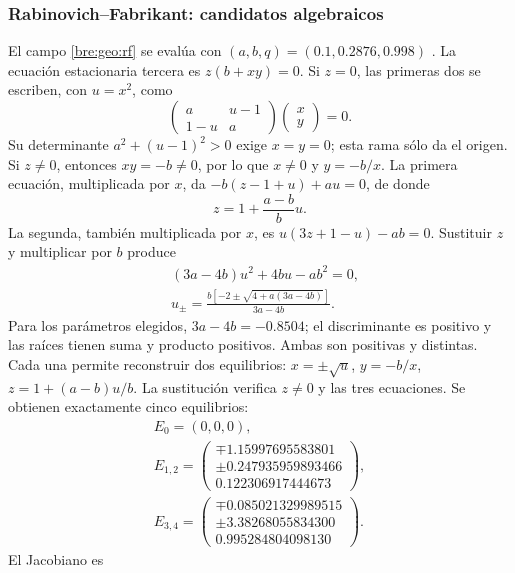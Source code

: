 \subsubsection{Rabinovich--Fabrikant: candidatos algebraicos}
El campo \eqref{bre:geo:rf} se evalúa con
\((a,b,q)=(0.1,0.2876,0.998)\) \cite{Danca2017}. La ecuación estacionaria
tercera es \(z(b+xy)=0\). Si \(z=0\), las primeras dos se escriben,
con \(u=x^2\), como
\[
 \begin{pmatrix}a&u-1\\1-u&a\end{pmatrix}
 \begin{pmatrix}x\\y\end{pmatrix}=0.
\]
Su determinante \(a^2+(u-1)^2>0\) exige \(x=y=0\); esta rama sólo da el
origen. Si \(z\ne0\), entonces \(xy=-b\ne0\), por lo que \(x\ne0\) y
\(y=-b/x\). La primera ecuación, multiplicada por \(x\), da
\(-b(z-1+u)+au=0\), de donde
\[
 z=1+\frac{a-b}{b}u.
\]
La segunda, también multiplicada por \(x\), es
\(u(3z+1-u)-ab=0\). Sustituir \(z\) y multiplicar por \(b\) produce
\begin{equation}
 \begin{aligned}
 &(3a-4b)u^2+4bu-ab^2=0,\\
 &u_\pm=\frac{b[-2\pm\sqrt{4+a(3a-4b)}]}{3a-4b}.
 \end{aligned}
 \label{bre:res:rf-equilibria-algebra}
\end{equation}
Para los parámetros elegidos, \(3a-4b=-0.8504\); el discriminante es
positivo y las raíces tienen suma y producto positivos. Ambas son
positivas y distintas. Cada una permite reconstruir dos equilibrios:
\(x=\pm\sqrt u\), \(y=-b/x\),
\(z=1+(a-b)u/b\). La sustitución verifica \(z\ne0\) y las tres ecuaciones.
Se obtienen exactamente cinco equilibrios:
\[
 \begin{gathered}
 E_0=(0,0,0),\\
 E_{1,2}=\begin{pmatrix}
 \mp1.15997695583801\\\pm0.247935959893466\\0.122306917444673
 \end{pmatrix},\\
 E_{3,4}=\begin{pmatrix}
 \mp0.085021329989515\\\pm3.38268055834300\\0.995284804098130
 \end{pmatrix}.
 \end{gathered}
\]
El Jacobiano es
